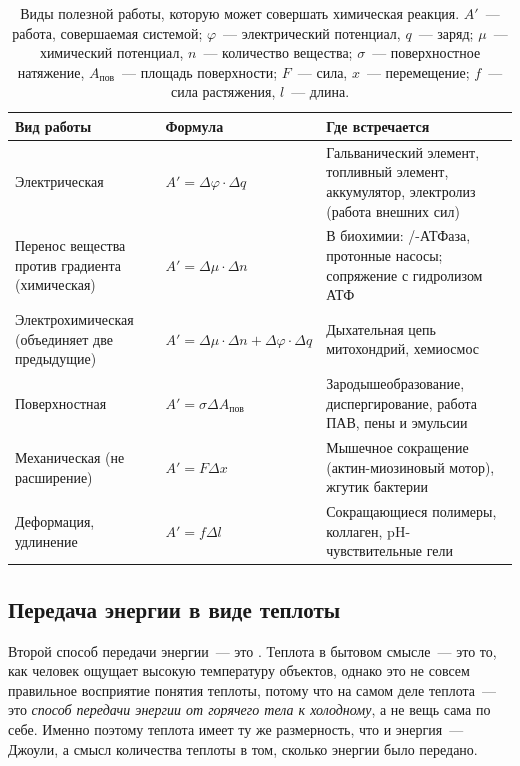 \begin{table}[htbp]
    \small
    \caption{Виды полезной работы, которую может совершать химическая реакция. $A'$~--- работа, совершаемая системой; $\varphi$~--- электрический потенциал, $q$~--- заряд; $\mu$~--- химический потенциал, $n$~--- количество вещества; $\sigma$~--- поверхностное натяжение, $A_{\text{пов}}$~--- площадь поверхности; $F$~--- сила, $x$~--- перемещение; $f$~--- сила растяжения, $l$~--- длина.}
    \label{tab:types_of_work}
    \begin{tabularx}{\textwidth}{
        >{\hsize}Y
        >{\hsize}Y
        >{\hsize}Y
        }
        \hline
        Вид работы & Формула & Где встречается \\
        \hline
        Электрическая & $A' = \Delta\varphi \cdot \Delta q$ & Гальванический элемент, топливный элемент, аккумулятор, электролиз (работа внешних сил) \\
        \hline
        Перенос вещества против градиента (химическая) & $A' = \Delta\mu \cdot \Delta n$ & В биохимии: /-АТФаза, протонные насосы; сопряжение с гидролизом АТФ \\
        \hline
        Электрохимическая (объединяет две предыдущие) & $A' = \Delta\mu \cdot \Delta n + \Delta\varphi \cdot \Delta q$ & Дыхательная цепь митохондрий, хемиосмос \\
        \hline
        Поверхностная & $A' = \sigma \Delta A_{\text{пов}}$ & Зародышеобразование, диспергирование, работа ПАВ, пены и эмульсии \\
        \hline
        Механическая (не расширение) & $A' = F \Delta x$ & Мышечное сокращение (актин-миозиновый мотор), жгутик бактерии \\
        \hline
        Деформация, удлинение & $A' = f \Delta l$ & Сокращающиеся полимеры, коллаген, pH-чувствительные гели \\
        \hline
    \end{tabularx}
\end{table}

\subsection*{Передача энергии в виде теплоты}

Второй способ передачи энергии~--- это . Теплота в бытовом смысле~--- это то, как человек ощущает высокую температуру объектов, однако это не совсем правильное восприятие понятия теплоты, потому что на самом деле теплота~--- это \emph{способ передачи энергии от горячего тела к холодному}, а не вещь сама по себе. Именно поэтому теплота имеет ту же размерность, что и энергия~--- Джоули, а смысл количества теплоты в том, сколько энергии было передано.

